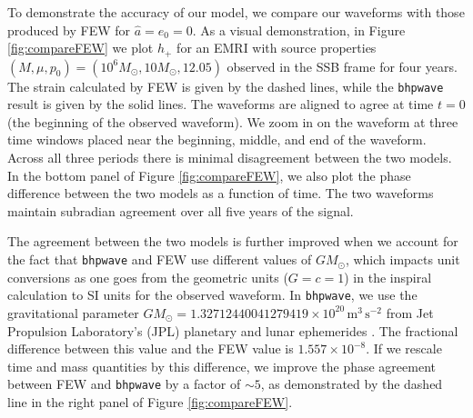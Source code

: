 \documentclass[%
 reprint,
 nofootinbib,
 amsmath,amssymb,
 aps,
 prd,
]{revtex4-2}
\begin{document}
To demonstrate the accuracy of our model, we compare our waveforms with those produced by FEW for $\hat{a} = e_0 = 0$. As a visual demonstration, in Figure \ref{fig:compareFEW} we plot $h_+$ for an EMRI with source properties $(M, \mu, p_0) = (10^6 M_\odot, 10 M_\odot, 12.05)$ observed in the SSB frame for four years. The strain calculated by FEW is given by the dashed lines, while the \texttt{bhpwave} result is given by the solid lines. The waveforms are aligned to agree at time $t=0$ (the beginning of the observed waveform). We zoom in on the waveform at three time windows placed near the beginning, middle, and end of the waveform. Across all three periods there is minimal disagreement between the two models. In the bottom panel of Figure \ref{fig:compareFEW}, we also plot the phase difference between the two models as a function of time. The two waveforms maintain subradian agreement over all five years of the signal. 

The agreement between the two models is further improved when we account for the fact that \texttt{bhpwave} and FEW use different values of $G M_\odot$, which impacts unit conversions as one goes from the geometric units ($G=c=1$) in the inspiral calculation to SI units for the observed waveform. In \texttt{bhpwave}, we use the gravitational parameter $G M_\odot = 1.32712440041279419 \times 10^{20}\, \mathrm{m}^3\, \mathrm{s}^{-2}$ from Jet Propulsion Laboratory's (JPL) planetary and lunar ephemerides \cite{ParkETC21}. The fractional difference between this value and the FEW value is $1.557\times 10^{-8}$. If we rescale time and mass quantities by this difference, we improve the phase agreement between FEW and \texttt{bhpwave} by a factor of $\sim 5$, as demonstrated by the dashed line in the right panel of Figure \ref{fig:compareFEW}.
\end{document}
